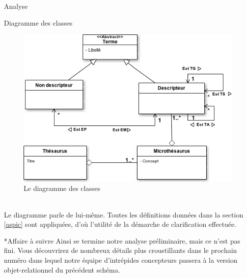 \documentclass[a4paper, 12pt]{report}
\begin{document}
\begin{chapter}{Analyse}
	\begin{section}{Diagramme des classes}
		\begin{figure}[h]
			\label{classeur}
			\begin{center}
				\includegraphics[width=13cm]{Classes.png}
				\caption{Le diagramme des classes}
			\end{center}
		\end{figure}~\\
		
		Le diagramme parle de lui-même. Toutes les définitions données dans la section \ref{aspic} sont appliquées, d'où l'utilité de la démarche de clarification
		effectuée.\\
	\end{section}
\end{chapter}

\begin{section}*{Affaire à suivre}
	Ainsi se termine notre analyse préliminaire, mais ce n'est pas fini.
	Vous découvrirez de nombreux détails plus croustillants dans le prochain numéro dans lequel notre équipe d'intrépides concepteurs passera
	à la version objet-relationnel du précédent schéma.
\end{section}
\end{document}
